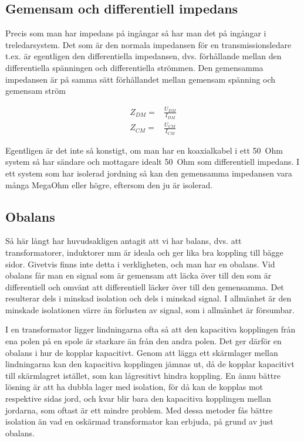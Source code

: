 \subsection{Gemensam och differentiell impedans}

Precis som man har impedans på ingångar så har man det på ingångar i
treledarsystem. Det som är den normala impedansen för en transmissionsledare
t.ex. är egentligen den differentiella impedansen, dvs. förhållande mellan den
differentiella spänningen och differentiella strömmen. Den gemensamma impedansen
är på samma sätt förhållandet mellan gemensam spänning och gemensam ström

\begin{eqnarray}
Z_{DM} = & \frac{U_{DM}}{I_{DM}}\\
Z_{CM} = & \frac{U_{CM}}{I_{CM}}
\end{eqnarray}

Egentligen är det inte så konstigt, om man har en koaxialkabel i ett 50~Ohm
system så har sändare och mottagare idealt 50~Ohm som differentiell impedans.
I ett system som har isolerad jordning så kan den gemensamma impedansen vara
många MegaOhm eller högre, eftersom den ju är isolerad.

\subsection{Obalans}

Så här långt har huvudsakligen antagit att vi har balans, dvs. att
transformatorer, induktorer mm är ideala och ger lika bra koppling till bägge
sidor. Givetvis finns inte detta i verkligheten, och man har en obalans.
Vid obalans får man en signal som är gemensam att läcka över till den som är
differentiell och omvänt att differentiell läcker över till den gemensamma.
Det resulterar dels i minskad isolation och dels i minskad signal.
I allmänhet är den minskade isolationen värre än förlusten av signal, som i
allmänhet är försumbar.

I en transformator ligger lindningarna ofta så att den kapacitiva kopplingen
från ena polen på en spole är starkare än från den andra polen.
Det ger därför en obalans i hur de kopplar kapacitivt. Genom att lägga ett
skärmlager mellan lindningarna kan den kapacitiva kopplingen jämnas ut, då de
kopplar kapacitivt till skärmlagret istället, som kan lågresitivt hindra
koppling. En ännu bättre lösning är att ha dubbla lager med isolation, för då
kan de kopplas mot respektive sidas jord, och kvar blir bara den kapacitiva
kopplingen mellan jordarna, som oftast är ett mindre problem. Med dessa metoder
fås bättre isolation än vad en oskärmad transformator kan erbjuda, på grund av
just obalans.

